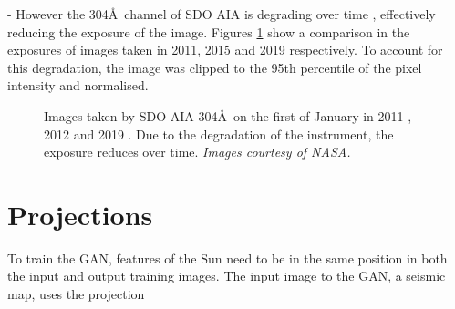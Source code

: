 \documentclass[11pt,a4paper,onecolumn]{report}
\begin{document}
- However the 304\AA \ channel of SDO AIA is degrading over time
\cite{boerner_photometric_2014}, effectively reducing the exposure of the
image. Figures \ref{fig:aia_degradation} show a comparison in the exposures of
images taken in 2011, 2015 and 2019 respectively. To account for this
degradation, the image was clipped to the 95th percentile of the pixel
intensity and normalised.


\begin{figure}[t]%
  \centering
  \qquad
  \qquad
  \caption[]{Images taken by SDO AIA 304\AA \ on the first of January in 2011
    , 2012  and 2019
    . Due to the degradation of the instrument, the
    exposure reduces over time. \textit{Images courtesy of NASA.}}
  \label{fig:aia_degradation}
\end{figure}





\section{Projections}
To train the GAN, features of the Sun need to be in the same position in both
the input and output training images. The input image to the GAN, a seismic map,
uses the projection
\end{document}
